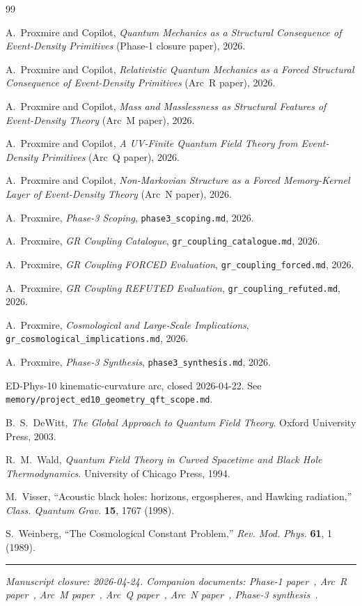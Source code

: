 \documentclass[11pt,a4paper]{article}
\begin{document}
\begin{thebibliography}{99}

A.~Proxmire and Copilot, \emph{Quantum Mechanics as a Structural Consequence of Event-Density Primitives} (Phase-1 closure paper), 2026.

A.~Proxmire and Copilot, \emph{Relativistic Quantum Mechanics as a Forced Structural Consequence of Event-Density Primitives} (Arc~R paper), 2026.

A.~Proxmire and Copilot, \emph{Mass and Masslessness as Structural Features of Event-Density Theory} (Arc~M paper), 2026.

A.~Proxmire and Copilot, \emph{A UV-Finite Quantum Field Theory from Event-Density Primitives} (Arc~Q paper), 2026.

A.~Proxmire and Copilot, \emph{Non-Markovian Structure as a Forced Memory-Kernel Layer of Event-Density Theory} (Arc~N paper), 2026.

A.~Proxmire, \emph{Phase-3 Scoping}, \texttt{phase3\_scoping.md}, 2026.

A.~Proxmire, \emph{GR Coupling Catalogue}, \texttt{gr\_coupling\_catalogue.md}, 2026.

A.~Proxmire, \emph{GR Coupling FORCED Evaluation}, \texttt{gr\_coupling\_forced.md}, 2026.

A.~Proxmire, \emph{GR Coupling REFUTED Evaluation}, \texttt{gr\_coupling\_refuted.md}, 2026.

A.~Proxmire, \emph{Cosmological and Large-Scale Implications}, \texttt{gr\_cosmological\_implications.md}, 2026.

A.~Proxmire, \emph{Phase-3 Synthesis}, \texttt{phase3\_synthesis.md}, 2026.

ED-Phys-10 kinematic-curvature arc, closed 2026-04-22. See \texttt{memory/project\_ed10\_geometry\_qft\_scope.md}.

B.~S.~DeWitt, \emph{The Global Approach to Quantum Field Theory}. Oxford University Press, 2003.

R.~M.~Wald, \emph{Quantum Field Theory in Curved Spacetime and Black Hole Thermodynamics}. University of Chicago Press, 1994.

M.~Visser, ``Acoustic black holes: horizons, ergospheres, and Hawking radiation,'' \emph{Class. Quantum Grav.} \textbf{15}, 1767 (1998).

S.~Weinberg, ``The Cosmological Constant Problem,'' \emph{Rev. Mod. Phys.} \textbf{61}, 1 (1989).

\end{thebibliography}

\vspace{1em}
\noindent\rule{\linewidth}{0.4pt}
\vspace{0.2em}

\noindent\emph{Manuscript closure: 2026-04-24. Companion documents: Phase-1 paper~\cite{phase1}, Arc~R paper~\cite{arcr}, Arc~M paper~\cite{arcm}, Arc~Q paper~\cite{arcq}, Arc~N paper~\cite{arcn}, Phase-3 synthesis~\cite{gr5}.}
\end{document}
